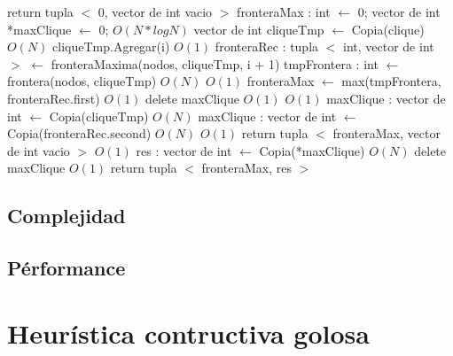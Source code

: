\documentclass[a4paper, 10pt, twoside]{article}
\newenvironment{pseudo}[1][]{%
    \vspace{1em}%
    \begin{algorithmic}%
}
{%
    \end{algorithmic}%
    \vspace{1em}%
}
\newcommand{\Ode}[1]{\hfill $O(#1)$}
\begin{document}
\begin{pseudo}
	 return tupla $<$ 0, vector de int vacio $>$ \EndIf
	\State fronteraMax : int $\leftarrow$ 0; 
	\State vector de int *maxClique $\leftarrow$ 0; 
																	\Ode{N*log N}
			\State vector de int cliqueTmp $\leftarrow$ Copia(clique)						\Ode{N}
			\State cliqueTmp.Agregar(i)																			\Ode{1}
			\State fronteraRec : tupla $<$ int, vector de int $>$ $\leftarrow$ fronteraMaxima(nodos, cliqueTmp, i + 1)
			\State tmpFrontera : int $\leftarrow$ frontera(nodos, cliqueTmp)		\Ode{N}
									\Ode{1}
				\State fronteraMax $\leftarrow$ max(tmpFrontera, fronteraRec.first)	\Ode{1}
				 delete maxClique \EndIf												\Ode{1}
																			\Ode{1}
					\State maxClique : vector de int $\leftarrow$ Copia(cliqueTmp)		\Ode{N}
				\Else
					\State maxClique : vector de int $\leftarrow$ Copia(fronteraRec.second) \Ode{N}
				\EndIf
			\EndIf
		\EndIf
	\EndFor
																									\Ode{1}
		\State return tupla $<$ fronteraMax, vector de int vacio $>$					\Ode{1}
	\Else
		 \State res : vector de int $\leftarrow$ Copia(*maxClique)						\Ode{N}
		\State delete maxClique																					\Ode{1}
		\State return tupla $<$ fronteraMax, res $>$
	\EndIf

\EndProcedure
\end{pseudo}

\subsection{Complejidad}

\subsection{Pérformance}


\newpage

\section{Heurística contructiva golosa}
\end{document}
